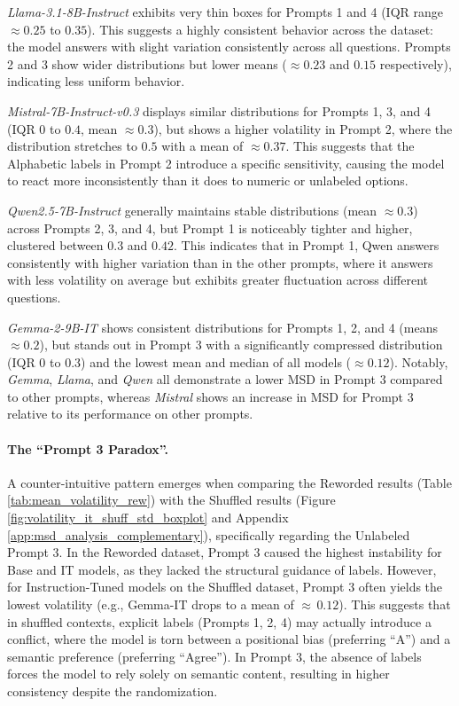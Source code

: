 \textit{Llama-3.1-8B-Instruct} exhibits very thin boxes for Prompts 1 and 4 (IQR range $\approx 0.25$ to $0.35$). This suggests a highly consistent behavior across the dataset: the model answers with slight variation consistently across all questions. Prompts 2 and 3 show wider distributions but lower means ($\approx 0.23$ and $0.15$ respectively), indicating less uniform behavior.

\textit{Mistral-7B-Instruct-v0.3} displays similar distributions for Prompts 1, 3, and 4 (IQR $0$ to $0.4$, mean $\approx 0.3$), but shows a higher volatility in Prompt 2, where the distribution stretches to $0.5$ with a mean of $\approx 0.37$. This suggests that the Alphabetic labels in Prompt 2 introduce a specific sensitivity, causing the model to react more inconsistently than it does to numeric or unlabeled options.

\textit{Qwen2.5-7B-Instruct} generally maintains stable distributions (mean $\approx 0.3$) across Prompts 2, 3, and 4, but Prompt 1 is noticeably tighter and higher, clustered between $0.3$ and $0.42$. This indicates that in Prompt 1, Qwen answers consistently with higher variation than in the other prompts, where it answers with less volatility on average but exhibits greater fluctuation across different questions.

\textit{Gemma-2-9B-IT} shows consistent distributions for Prompts 1, 2, and 4 (means $\approx 0.2$), but stands out in Prompt 3 with a significantly compressed distribution (IQR $0$ to $0.3$) and the lowest mean and median of all models ($\approx 0.12$).
Notably, \textit{Gemma}, \textit{Llama}, and \textit{Qwen} all demonstrate a lower MSD in Prompt 3 compared to other prompts, whereas \textit{Mistral} shows an increase in MSD for Prompt 3 relative to its performance on other prompts.

\vspace{-0.4cm}
\paragraph{The ``Prompt 3 Paradox''.}
A counter-intuitive pattern emerges when comparing the Reworded results (Table \ref{tab:mean_volatility_rew}) with the Shuffled results (Figure \ref{fig:volatility_it_shuff_std_boxplot} and Appendix \ref{app:msd_analysis_complementary}), specifically regarding the Unlabeled Prompt 3. In the Reworded dataset, Prompt 3 caused the highest instability for Base and IT models, as they lacked the structural guidance of labels. However, for Instruction-Tuned models on the Shuffled dataset, Prompt 3 often yields the lowest volatility (e.g., Gemma-IT drops to a mean of $\approx\,0.12$). This suggests that in shuffled contexts, explicit labels (Prompts 1, 2, 4) may actually introduce a conflict, where the model is torn between a positional bias (preferring ``A'') and a semantic preference (preferring ``Agree''). In Prompt 3, the absence of labels forces the model to rely solely on semantic content, resulting in higher consistency despite the randomization.


